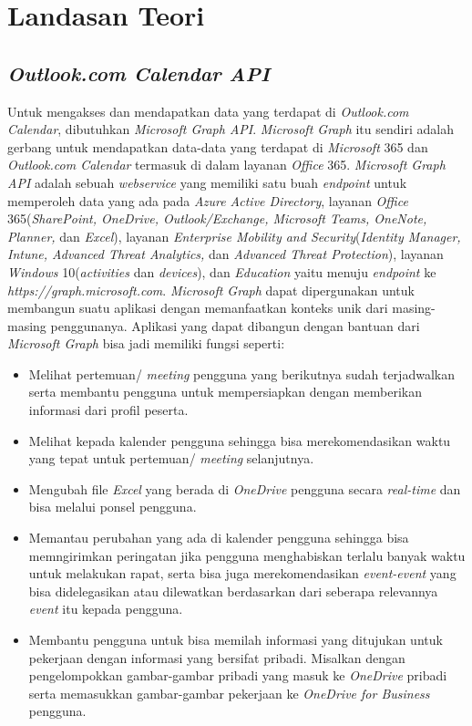 \chapter{Landasan Teori}
\label{chap:teori}

\section{\textit{Outlook.com Calendar API}}
\label{sec:outlookCalendar}
Untuk mengakses dan mendapatkan data yang terdapat di \textit{Outlook.com Calendar}, dibutuhkan \textit{Microsoft Graph API}. \textit{Microsoft Graph} itu sendiri adalah gerbang untuk mendapatkan data-data yang terdapat di \textit{Microsoft} 365 dan \textit{Outlook.com Calendar} termasuk di dalam layanan \textit{Office} 365. \textit{Microsoft Graph API} adalah sebuah \textit{webservice} yang memiliki satu buah \textit{endpoint} untuk memperoleh data yang ada pada \textit{Azure Active Directory}, layanan \textit{Office} 365(\textit{SharePoint, OneDrive, Outlook/Exchange, Microsoft Teams, OneNote, Planner,} dan \textit{Excel}), layanan \textit{Enterprise Mobility and Security}(\textit{Identity Manager, Intune, Advanced Threat Analytics,} dan \textit{Advanced Threat Protection}), layanan \textit{Windows} 10(\textit{activities} dan \textit{devices}), dan \textit{Education }yaitu menuju \textit{endpoint} ke \textit{https://graph.microsoft.com}. \textit{Microsoft Graph} dapat dipergunakan untuk membangun suatu aplikasi dengan memanfaatkan konteks unik dari masing-masing penggunanya. Aplikasi yang dapat dibangun dengan bantuan dari \textit{Microsoft Graph} bisa jadi memiliki fungsi seperti:

\begin{itemize}
\item Melihat pertemuan/ \textit{meeting} pengguna yang berikutnya sudah terjadwalkan serta membantu pengguna untuk mempersiapkan dengan memberikan informasi dari profil peserta. 
\item Melihat kepada kalender pengguna sehingga bisa merekomendasikan waktu yang tepat untuk pertemuan/ \textit{meeting} selanjutnya. 
\item Mengubah file \textit{Excel} yang berada di \textit{OneDrive} pengguna secara \textit{real-time} dan bisa melalui ponsel pengguna.
\item Memantau perubahan yang ada di kalender pengguna sehingga bisa memngirimkan peringatan jika pengguna menghabiskan terlalu banyak waktu untuk melakukan rapat, serta bisa juga merekomendasikan \textit{event-event} yang bisa didelegasikan atau dilewatkan berdasarkan dari seberapa relevannya \textit{event} itu kepada pengguna.
\item Membantu pengguna untuk bisa memilah informasi yang ditujukan untuk pekerjaan dengan informasi yang bersifat pribadi. Misalkan dengan pengelompokkan gambar-gambar pribadi yang masuk ke \textit{OneDrive} pribadi serta memasukkan gambar-gambar pekerjaan ke \textit{OneDrive for Business} pengguna.     
\end{itemize} 

